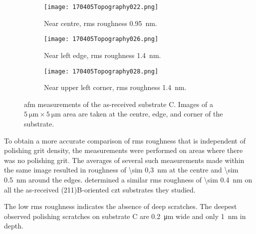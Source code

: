 \begin{figure}[htbp]
    \centering
    \begin{subfigure}[t]{\linewidth}
    \centering
        \texttt{[image: 170405Topography022.png]}
        \caption{Near centre, \ac{rms} roughness \SI{0.95}{\nano\metre}.}%
    \end{subfigure}
    \par\bigskip
    \begin{subfigure}[t]{\linewidth}
    \centering
        \texttt{[image: 170405Topography026.png]}
        \caption{Near left edge, \ac{rms} roughness \SI{1.4}{\nano\metre}.}%
    \end{subfigure}
    \par\bigskip
    \begin{subfigure}[t]{\linewidth}
    \centering
        \texttt{[image: 170405Topography028.png]}
        \caption{Near upper left corner, \ac{rms} roughness \SI{1.4}{\nano\metre}.}%
    \end{subfigure}
    \caption[\Ac{afm} of as-received substrate C.]{\Acf{afm} measurements of the as-received substrate C. Images of a $\SI{5}{\micro\metre}\times\SI{5}{\micro\metre}$ area are taken at the centre, edge, and corner of the substrate.}
    \label{fig:afm_subC}
\end{figure} %

To obtain a more accurate comparison of \ac{rms} roughness that is independent of polishing grit density, the measurements were performed on areas where there was no polishing grit. The averages of several such measurements made within the same image resulted in  roughness of \SI{\sim 0,3}{\nano\metre} at the centre and \SI{\sim 0.5}{\nano\metre} around the edges. \citet{benson2015as-received} determined a similar \ac{rms} roughness of \SI{\sim 0.4}{\nano\metre} on all the as-received (211)B-oriented \ac{czt} substrates they studied.

The low \ac{rms} roughness indicates the absence of deep scratches. The deepest observed polishing scratches on substrate C are \SI{0,2}{\micro\metre} wide and only \SI{1}{\nano\metre} in depth. 

